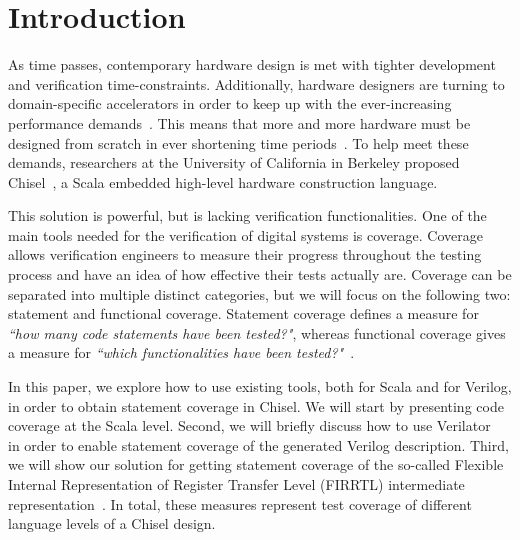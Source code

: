\documentclass[conference]{IEEEtran}
\newcommand{\martin}[1]{{\color{blue} Martin: #1}}
\begin{document}

\section{Introduction}
\label{sec:objectives}
As time passes, contemporary hardware design is met with tighter development and verification time-constraints. Additionally, hardware designers are turning to domain-specific accelerators in order to keep up with the ever-increasing performance demands~\cite{henn-patt:turing:2019}. This means that more and more hardware must be designed from scratch in ever shortening time periods~\cite{domain-hw-acc:2020}.  To help meet these demands, researchers at the University of California in Berkeley proposed Chisel~\cite{chisel:dac2012}, a Scala embedded high-level hardware construction language.

This solution is powerful, but is lacking verification functionalities. One of the main tools needed for the verification of digital systems is coverage. Coverage allows verification engineers to measure their progress throughout the testing process and have an idea of how effective their tests actually are. Coverage can be separated into multiple distinct categories, but we will focus on the following two: statement and functional coverage. Statement coverage defines a measure for \textit{``how many code statements have been tested?"}, whereas functional coverage gives a measure for \textit{``which functionalities have been tested?"}~\cite{spear2008systemverilog}.


In this paper, we explore how to use existing tools, both for Scala and for Verilog, in order to obtain statement coverage in Chisel. We will start by presenting code coverage at the Scala level. Second, we will briefly discuss how to use Verilator~\cite{verilator} in order to enable statement coverage of the generated Verilog description. Third, we will show our solution for getting statement coverage of the so-called Flexible Internal Representation of Register Transfer Level (FIRRTL) intermediate representation~\cite{firrtl}. In total, these measures represent test coverage of different language levels of a Chisel design.
\end{document}
